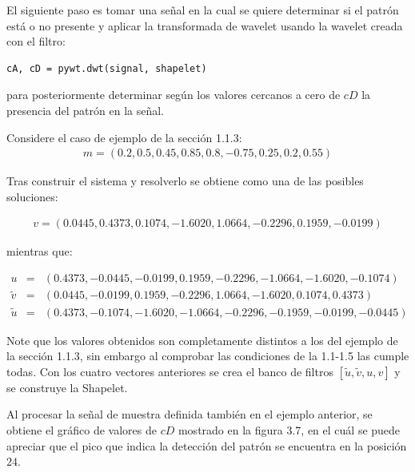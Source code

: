 \par El siguiente paso es tomar una se\~nal en la cual se quiere determinar si el patr\'on est\'a o no presente y aplicar la transformada de wavelet usando la wavelet creada con el filtro:\\

\begin{lstlisting}[caption=C\'alculo de la transformada discreta de Wavelet usando pywt]
cA, cD = pywt.dwt(signal, shapelet)
\end{lstlisting}

para posteriormente determinar seg\'un los valores cercanos a cero de $cD$ la presencia del patr\'on en la se\~nal.

Considere el caso de ejemplo de la secci\'on 1.1.3:
\begin{eqnarray}
m=(0.2,0.5,0.45,0.85,0.8,-0.75,0.25,0.2,0.55)\nonumber
\end{eqnarray}

\par Tras construir el sistema y resolverlo se obtiene como una de las posibles soluciones:

\begin{eqnarray}
v=(0.0445, 0.4373, 0.1074, -1.6020, 1.0664, -0.2296, 0.1959, -0.0199)\nonumber
\end{eqnarray}

mientras que:

\begin{eqnarray}
u&=&(0.4373, -0.0445, -0.0199, 0.1959, -0.2296, -1.0664, -1.6020, -0.1074)\nonumber\\
\tilde{v}&=&(0.0445, -0.0199, 0.1959, -0.2296, 1.0664, -1.6020, 0.1074, 0.4373)\nonumber\\
\tilde{u}&=&(0.4373, -0.1074, -1.6020, -1.0664, -0.2296, -0.1959, -0.0199, -0.0445)\nonumber
\end{eqnarray}

\par Note que los valores obtenidos son completamente distintos a los del ejemplo de la secci\'on 1.1.3, sin embargo al comprobar las condiciones de la 1.1-1.5 las cumple todas. Con los cuatro vectores anteriores se crea el banco de filtros $[\tilde{u},\tilde{v},u,v]$ y se construye la Shapelet.\\

\par Al procesar la se\~nal de muestra definida tambi\'en en el ejemplo anterior, se obtiene el gr\'afico de valores de $cD$ mostrado en la figura 3.7, en el cu\'al se puede apreciar que el pico que indica la detecci\'on del patr\'on se encuentra en la posici\'on $24$.

